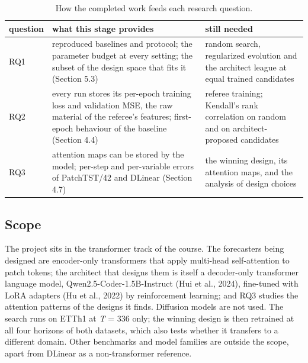 \documentclass[11pt,letterpaper]{article}
\begin{document}
\begin{table}[htbp]
\centering
\caption{How the completed work feeds each research question.}\label{tab:1}
{\footnotesize\setlength{\tabcolsep}{3pt}
\begin{tabular}{>{\raggedright\arraybackslash}p{}>{\raggedright\arraybackslash}p{}>{\raggedright\arraybackslash}p{}}
\toprule
\textbf{question} & \textbf{what this stage provides} & \textbf{still needed} \\
\midrule
RQ1 & reproduced baselines and protocol; the parameter budget at every setting; the subset of the design space that fits it (Section 5.3) & random search, regularized evolution and the architect league at equal trained candidates \\
RQ2 & every run stores its per-epoch training loss and validation MSE, the raw material of the referee's features; first-epoch behaviour of the baseline (Section 4.4) & referee training; Kendall's rank correlation on random and on architect-proposed candidates \\
RQ3 & attention maps can be stored by the model; per-step and per-variable errors of PatchTST/42 and DLinear (Section 4.7) & the winning design, its attention maps, and the analysis of design choices \\
\bottomrule
\end{tabular}}
\end{table}

\subsection{Scope}
The project sits in the transformer track of the course. The forecasters being designed are encoder-only transformers that apply multi-head self-attention to patch tokens; the architect that designs them is itself a decoder-only transformer language model, Qwen2.5-Coder-1.5B-Instruct (Hui et al., 2024), fine-tuned with LoRA adapters (Hu et al., 2022) by reinforcement learning; and RQ3 studies the attention patterns of the designs it finds. Diffusion models are not used. The search runs on ETTh1 at \textit{T} = 336 only; the winning design is then retrained at all four horizons of both datasets, which also tests whether it transfers to a different domain. Other benchmarks and model families are outside the scope, apart from DLinear as a non-transformer reference.
\end{document}
